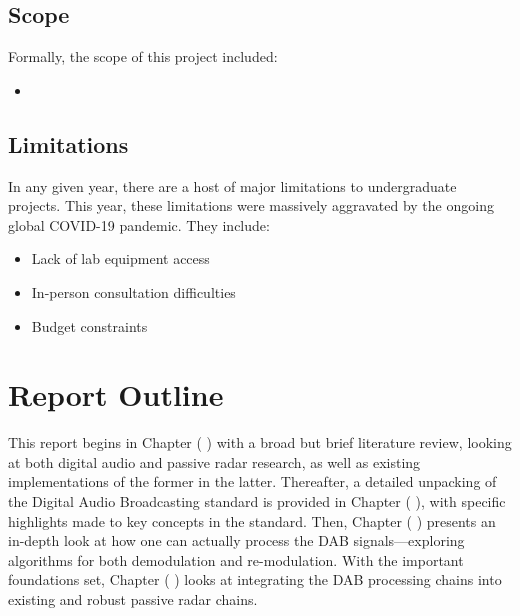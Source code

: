 \documentclass[class=report,11pt,crop=false]{standalone}
\begin{document}
\subsection{Scope}
Formally, the scope of this project included:
\begin{itemize}
    \item 
\end{itemize}

\subsection{Limitations}
In any given year, there are a host of major limitations to undergraduate projects. This year, these limitations were massively aggravated by the ongoing global COVID-19 pandemic. They include:
\begin{itemize}
    \item Lack of lab equipment access
    \item In-person consultation difficulties
    \item Budget constraints
\end{itemize}


\section{Report Outline}
This report begins in Chapter ( ) with a broad but brief literature review, looking at both digital audio and passive radar research, as well as existing implementations of the former in the latter. Thereafter, a detailed unpacking of the Digital Audio Broadcasting standard is provided in Chapter ( ), with specific highlights made to key concepts in the standard. Then, Chapter ( ) presents an in-depth look at how one can actually process the DAB signals---exploring algorithms for both demodulation and re-modulation. With the important foundations set, Chapter ( ) looks at integrating the DAB processing chains into existing and robust passive radar chains.




\ifstandalone

\printnoidxglossary[type=\acronymtype]
\fi
\end{document}
